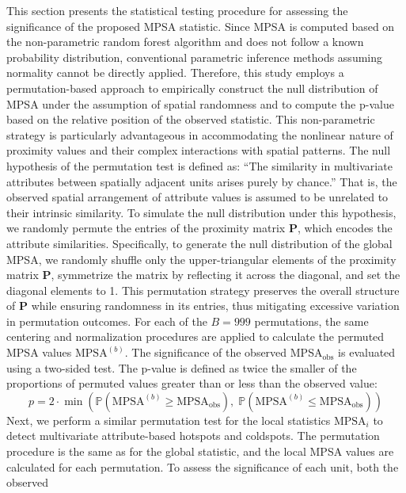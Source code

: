 \documentclass[
  a4paper,
  12pt]{article}
\begin{document}
This section presents the statistical testing procedure for assessing
the significance of the proposed MPSA statistic. Since MPSA is computed
based on the non-parametric random forest algorithm and does not follow
a known probability distribution, conventional parametric inference
methods assuming normality cannot be directly applied. Therefore, this
study employs a permutation-based approach to empirically construct the
null distribution of MPSA under the assumption of spatial randomness and
to compute the p-value based on the relative position of the observed
statistic. This non-parametric strategy is particularly advantageous in
accommodating the nonlinear nature of proximity values and their complex
interactions with spatial patterns. The null hypothesis of the
permutation test is defined as: ``The similarity in multivariate
attributes between spatially adjacent units arises purely by chance.''
That is, the observed spatial arrangement of attribute values is assumed
to be unrelated to their intrinsic similarity. To simulate the null
distribution under this hypothesis, we randomly permute the entries of
the proximity matrix \(\mathbf{P}\), which encodes the attribute
similarities. Specifically, to generate the null distribution of the
global MPSA, we randomly shuffle only the upper-triangular elements of
the proximity matrix \(\mathbf{P}\), symmetrize the matrix by reflecting
it across the diagonal, and set the diagonal elements to 1. This
permutation strategy preserves the overall structure of \(\mathbf{P}\)
while ensuring randomness in its entries, thus mitigating excessive
variation in permutation outcomes. For each of the \(B=999\)
permutations, the same centering and normalization procedures are
applied to calculate the permuted MPSA values \(\text{MPSA}^{(b)}\). The
significance of the observed MPSA\(_\text{obs}\) is evaluated using a
two-sided test. The p-value is defined as twice the smaller of the
proportions of permuted values greater than or less than the observed
value: \begin{equation}
p = 2 \cdot \min\left(\mathbb{P}(\text{MPSA}^{(b)} \geq \text{MPSA}_\text{obs}), \; \mathbb{P}(\text{MPSA}^{(b)} \leq \text{MPSA}_\text{obs})\right)
\end{equation} Next, we perform a similar permutation test for the local
statistics \(\text{MPSA}_i\) to detect multivariate attribute-based
hotspots and coldspots. The permutation procedure is the same as for the
global statistic, and the local MPSA values are calculated for each
permutation. To assess the significance of each unit, both the observed
\end{document}
